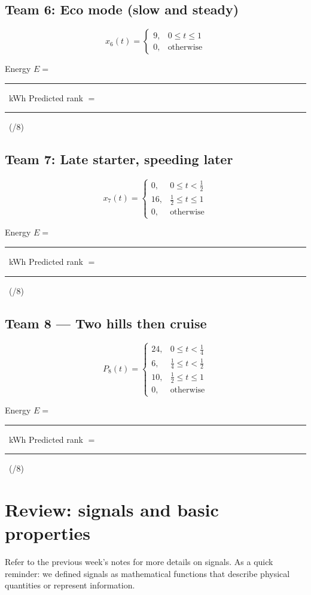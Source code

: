 \documentclass{ee102_notes}
\newcommand{\Eblank}{\rule{3cm}{0.4pt}}
\newcommand{\Rankblank}{\rule{3cm}{0.4pt}}
\begin{document}
\subsection*{Team 6: Eco mode (slow and steady)}
\[
x_6(t)=
\begin{cases}
9, & 0 \le t \le 1 \\
0, & \text{otherwise}
\end{cases}
\]
\begin{tcolorbox}[title=Team 6: Record your results]
Energy \(E=\) \Eblank\ \si{kWh} \quad\quad Predicted rank \(=\) \Rankblank\ (/8)
\end{tcolorbox}

\subsection*{Team 7: Late starter, speeding later}
\[
x_7(t)=
\begin{cases}
0, & 0 \le t < \tfrac{1}{2} \\
16, & \tfrac{1}{2} \le t \le 1 \\
0, & \text{otherwise}
\end{cases}
\]
\begin{tcolorbox}[title=Team 7: Record your results]
Energy \(E=\) \Eblank\ \si{kWh} \quad\quad Predicted rank \(=\) \Rankblank\ (/8)
\end{tcolorbox}

\subsection*{Team 8 — Two hills then cruise}
\[
P_8(t)=
\begin{cases}
24, & 0 \le t < \tfrac{1}{4} \\
6,  & \tfrac{1}{4} \le t < \tfrac{1}{2} \\
10, & \tfrac{1}{2} \le t \le 1 \\
0,  & \text{otherwise}
\end{cases}
\]
\begin{tcolorbox}[title=Team 8: Record your results]
Energy \(E=\) \Eblank\ \si{kWh} \quad\quad Predicted rank \(=\) \Rankblank\ (/8)
\end{tcolorbox}
\newpage

\section{Review: signals and basic properties}
Refer to the previous week's notes for more details on signals. As a quick reminder: we defined signals as mathematical functions that describe physical quantities or represent information. 
\end{document}
